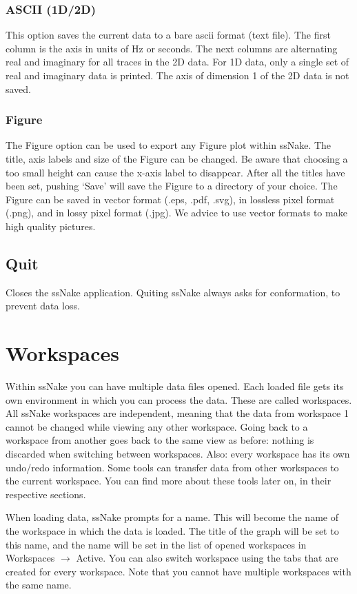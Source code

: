 \documentclass[11pt,a4paper]{article}
\begin{document}
\subsubsection*{ASCII (1D/2D)}
This option saves the current data to a bare ascii format (text file). The first column is the axis in units of Hz or seconds. The next columns are alternating real and imaginary for all traces in the 2D data. For 1D data, only a single set of real and imaginary data is printed. The axis of dimension 1 of the 2D data is not saved.

\subsubsection*{Figure}
The Figure option can be used to export any Figure plot within ssNake. The title, axis labels and size of the Figure can be changed. Be aware that choosing a too small height can cause the x-axis label to disappear. After all the titles have been set, pushing `Save' will save the Figure to a directory of your choice. The Figure can be saved in vector format (.eps, .pdf, .svg), in lossless pixel format (.png), and in lossy pixel format (.jpg). We advice to use vector formats to make high quality pictures.

\subsection{Quit}
Closes the ssNake application. Quiting ssNake always asks for conformation, to prevent data loss.

\section{Workspaces}
Within ssNake you can have multiple data files opened. Each loaded file gets its own environment in which you can process the data. These are called workspaces. All ssNake workspaces are independent, meaning that the data from workspace 1 cannot be changed while viewing any other workspace. Going back to a workspace from another goes back to the same view as before:  nothing is discarded when switching between workspaces. Also: every workspace has its own undo/redo information. Some tools can transfer data from other workspaces to the current workspace. You can find more about these tools later on, in their respective sections.

When loading data, ssNake prompts for a name. This will become the name of the workspace in which the data is loaded. The title of the graph will be set to this name, and the name will be set in the list of opened workspaces in Workspaces $\rightarrow$ Active. You can also switch workspace using the tabs that are created for every workspace. Note that you cannot have multiple workspaces with the same name.
\end{document}

